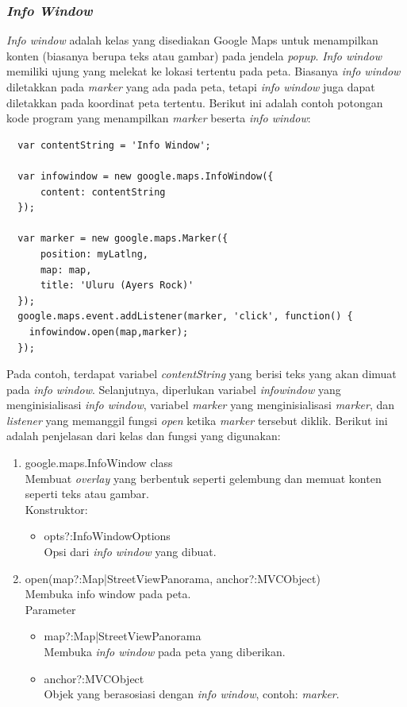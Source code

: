\subsubsection{\textit{Info Window}}
\textit{Info window} adalah kelas yang disediakan Google Maps untuk menampilkan
konten (biasanya berupa teks atau gambar) pada jendela \textit{popup}.
\textit{Info window} memiliki ujung yang melekat ke lokasi tertentu pada peta.
Biasanya \textit{info window} diletakkan pada \textit{marker} yang ada pada
peta, tetapi \textit{info window} juga dapat diletakkan pada koordinat peta
tertentu. Berikut ini adalah contoh potongan kode program yang menampilkan
\textit{marker} beserta \textit{info window}:
\begin{verbatim}
  var contentString = 'Info Window';

  var infowindow = new google.maps.InfoWindow({
      content: contentString
  });

  var marker = new google.maps.Marker({
      position: myLatlng,
      map: map,
      title: 'Uluru (Ayers Rock)'
  });
  google.maps.event.addListener(marker, 'click', function() {
    infowindow.open(map,marker);
  });
\end{verbatim}
Pada contoh, terdapat variabel \textit{contentString} yang berisi teks yang akan
dimuat pada \textit{info window}. Selanjutnya, diperlukan variabel
\textit{infowindow} yang menginisialisasi \textit{info window}, variabel
\textit{marker} yang menginisialisasi \textit{marker}, dan \textit{listener}
yang memanggil fungsi \textit{open} ketika \textit{marker} tersebut diklik.
Berikut ini adalah penjelasan dari kelas dan fungsi yang digunakan:
\begin{enumerate}
\item google.maps.InfoWindow class\\
  Membuat \textit{overlay} yang berbentuk seperti gelembung dan memuat konten
  seperti teks atau gambar.\\
  Konstruktor:
  \begin{itemize}
    \item opts?:InfoWindowOptions\\
    Opsi dari \textit{info window} yang dibuat.
  \end{itemize}
  
\item open(map?:Map|StreetViewPanorama, anchor?:MVCObject)\\
  Membuka info window pada peta.\\
  Parameter
  \begin{itemize}
    \item map?:Map|StreetViewPanorama\\
    Membuka \textit{info window} pada peta yang diberikan.
    
    \item anchor?:MVCObject\\
    Objek yang berasosiasi dengan \textit{info window}, contoh: \textit{marker}.
  \end{itemize}
\end{enumerate}
